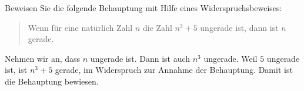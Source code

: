 Beweisen Sie die folgende Behauptung mit Hilfe eines Widerspruchsbeweises:
\begin{quote}
Wenn für eine natürlich Zahl $n$ die Zahl $n^3+5$ ungerade ist, dann ist
$n$ gerade.
\end{quote}

\begin{loesung}
Nehmen wir an, dass $n$ ungerade ist.
Dann ist auch $n^3$ ungerade.
Weil $5$ ungerade ist, ist $n^3+5$ gerade, im Widerspruch zur Annahme
der Behauptung.
Damit ist die Behauptung bewiesen.
\end{loesung}
